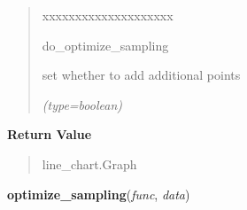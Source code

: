 \begin{boxedminipage}{\funcwidth}
\begin{quote}
\begin{Ventry}{xxxxxxxxxxxxxxxxxxxx}
          \item[do\_optimize\_sampling]

          set whether to add additional points

            {\it (type=boolean)}

        \end{Ventry}

      \end{quote}

      \textbf{Return Value}
    \vspace{-1ex}

      \begin{quote}
      line\_chart.Graph

      \end{quote}

    \end{boxedminipage}

    \label{pygtk_chart:line_chart:optimize_sampling}

    \vspace{0.5ex}

\hspace{.8\funcindent}\begin{boxedminipage}{\funcwidth}

    \raggedright \textbf{optimize\_sampling}(\textit{func}, \textit{data})

\setlength{\parskip}{2ex}
\setlength{\parskip}{1ex}
    \end{boxedminipage}

    \label{pygtk_chart:line_chart:graph_new_from_file}

    \vspace{0.5ex}

